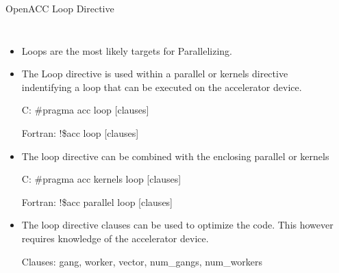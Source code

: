 \documentclass[c,mathserif,compress,xcolor=svgnames]{beamer}
\newenvironment{eblock}[0]
{
\begin{beamerboxesrounded}[upper=uppercol2,lower=lowercol2,shadow=true]}
{\end{beamerboxesrounded}}
\begin{document}
\begin{frame}{\small OpenACC Loop Directive}
  \begin{columns}
    \begin{itemize}
      \item Loops are the most likely targets for Parallelizing.
      \item The Loop directive is used within a parallel or kernels directive indentifying a loop that can be executed on the accelerator device.
      \item[C:] {\color{red!90!black}\#pragma acc loop [clauses]}
      \item[Fortran:] {\color{red!90!black}!\$acc loop [clauses]}
      \item The loop directive can be combined with the enclosing parallel or kernels
      \item[C:] {\color{red!90!black}\#pragma acc kernels loop [clauses]}
      \item[Fortran:] {\color{red!90!black}!\$acc parallel loop [clauses]}
      \item The loop directive clauses can be used to optimize the code. This however requires knowledge of the accelerator device.
      \item[Clauses:] gang, worker, vector, num\_gangs, num\_workers
    \end{itemize}
    \begin{eblock}{}
      
      
    \end{eblock}
  \end{columns}
\end{frame}
\end{document}
